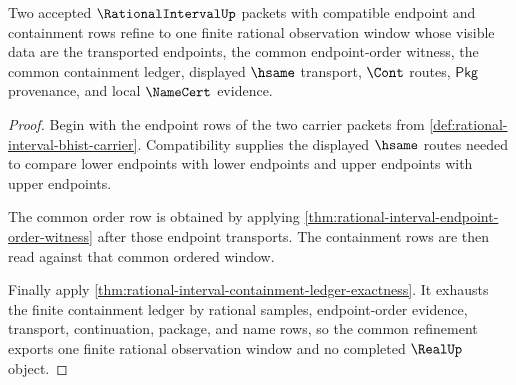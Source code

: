 \begin{theorem}
\label{thm:rational-interval-common-refinement-window}
Two accepted $\RationalIntervalUp$ packets with compatible endpoint and
containment rows refine to one finite rational observation window whose
visible data are the transported endpoints, the common endpoint-order
witness, the common containment ledger, displayed $\hsame$ transport,
$\Cont$ routes, $\mathsf{Pkg}$ provenance, and local $\NameCert$ evidence.
\end{theorem}
\begin{proof}
Begin with the endpoint rows of the two carrier packets from
\autoref{def:rational-interval-bhist-carrier}. Compatibility supplies the
displayed $\hsame$ routes needed to compare lower endpoints with lower
endpoints and upper endpoints with upper endpoints.

The common order row is obtained by applying
\autoref{thm:rational-interval-endpoint-order-witness} after those endpoint
transports. The containment rows are then read against that common ordered
window.

Finally apply
\autoref{thm:rational-interval-containment-ledger-exactness}. It exhausts the
finite containment ledger by rational samples, endpoint-order evidence,
transport, continuation, package, and name rows, so the common refinement
exports one finite rational observation window and no completed $\RealUp$
object.
\end{proof}

